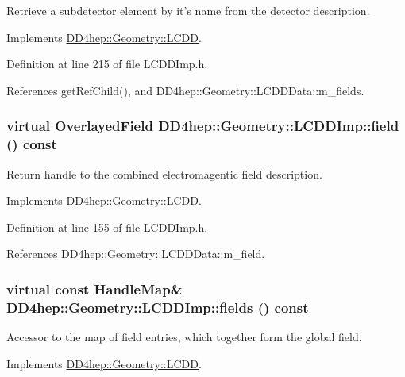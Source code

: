 Retrieve a subdetector element by it's name from the detector description. 

Implements \hyperlink{class_d_d4hep_1_1_geometry_1_1_l_c_d_d_adcc7929860f5ac592d8f4c2d476555e9}{DD4hep::Geometry::LCDD}.

Definition at line 215 of file LCDDImp.h.

References getRefChild(), and DD4hep::Geometry::LCDDData::m\_\-fields.\hypertarget{class_d_d4hep_1_1_geometry_1_1_l_c_d_d_imp_a9aaabd067b030c0999bad0ea212d8e2e}{
\subsubsection[{field}]{\setlength{\rightskip}{0pt plus 5cm}virtual {\bf OverlayedField} DD4hep::Geometry::LCDDImp::field () const}}
\label{class_d_d4hep_1_1_geometry_1_1_l_c_d_d_imp_a9aaabd067b030c0999bad0ea212d8e2e}


Return handle to the combined electromagentic field description. 

Implements \hyperlink{class_d_d4hep_1_1_geometry_1_1_l_c_d_d_a62750fbd02e0f4e06c570d00dc9eb2ca}{DD4hep::Geometry::LCDD}.

Definition at line 155 of file LCDDImp.h.

References DD4hep::Geometry::LCDDData::m\_\-field.\hypertarget{class_d_d4hep_1_1_geometry_1_1_l_c_d_d_imp_aa4d77c879e369bc0e637e02448c5651f}{
\subsubsection[{fields}]{\setlength{\rightskip}{0pt plus 5cm}virtual const {\bf HandleMap}\& DD4hep::Geometry::LCDDImp::fields () const}}
\label{class_d_d4hep_1_1_geometry_1_1_l_c_d_d_imp_aa4d77c879e369bc0e637e02448c5651f}


Accessor to the map of field entries, which together form the global field. 

Implements \hyperlink{class_d_d4hep_1_1_geometry_1_1_l_c_d_d_af2622f438504300116fabfa214b23be5}{DD4hep::Geometry::LCDD}.

